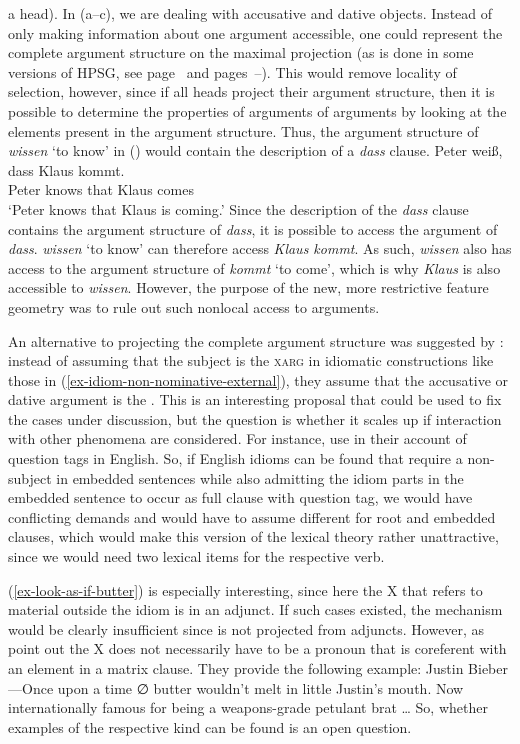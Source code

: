 a head). In (a--c), we are dealing with accusative and dative objects. Instead of only making information about one argument accessible,
one could represent the complete argument structure on the maximal projection (as is done in some
versions of HPSG, see page~\pageref{Seite-Bender-Wambaya} and pages~\pageref{page-Bender-Wambaya-two}--\pageref{page-non-cancellation-end}). This would remove locality of selection, however,
since if all heads project their argument structure, then it is possible to determine the properties of arguments of arguments by looking at the elements
present in the argument structure. Thus, the argument structure of \emph{wissen} `to know' in ()
would contain the description of a \emph{dass} clause.
\ea
\gll Peter weiß, dass Klaus kommt.\\
	 Peter knows that Klaus comes\\
\glt `Peter knows that Klaus is coming.'
\z
Since the description of the \emph{dass} clause contains the argument structure of \emph{dass}, it is possible to access the argument of \emph{dass}.
\emph{wissen} `to know' can therefore access \emph{Klaus kommt}. As such, \emph{wissen}  also has access to the argument structure
of \emph{kommt} `to come', which is why \emph{Klaus} is also accessible to \emph{wissen}. However,
the purpose of the new, more restrictive feature geometry was to rule out such nonlocal access to
arguments. 

An alternative to projecting the complete argument structure was suggested by
\citet[Section~6]{KSF2015a}: instead of assuming that the subject is the \textsc{xarg} in idiomatic
constructions like those in (\ref{ex-idiom-non-nominative-external}), they assume that the
accusative or dative argument is the \xarg. This is an interesting proposal that could be used to
fix the cases under discussion, but the question is whether it scales up if interaction with other
phenomena are considered. For instance, \citet{BF99a} use \xarg in their account of question tags in
English. So, if English idioms can be found that require a non-subject \xarg in embedded
sentences while also admitting the idiom parts in the embedded sentence to occur as full clause with
question tag, we would have conflicting demands and would have to assume different \xargs for root
and embedded clauses, which would make this version of the lexical theory rather unattractive, since
we would need two lexical items for the respective verb.

(\ref{ex-look-as-if-butter}) is especially interesting, since here the X that refers to material
outside the idiom is in an adjunct. If such cases existed, the \xarg mechanism would be clearly
insufficient since \xarg is not projected from adjuncts. However, as \citet{KSF2015a} point out the
X does not necessarily have to be a pronoun that is coreferent with an element in a matrix
clause. They provide the following example:
\ea
Justin Bieber—Once upon a time ∅ butter wouldn't melt in little Justin's mouth. Now internationally
famous for being a weapons-grade petulant brat \ldots
\z
So, whether examples of the respective kind can be found is an open question.

